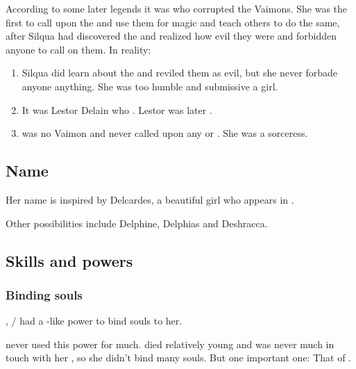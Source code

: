 According to some later legends it was \Delphine who corrupted the Vaimons.
She was the first to call upon the \qliphoth and use them for magic and teach others to do the same, after Silqua had discovered the \qliphoth and realized how evil they were and forbidden anyone to call on them.
In reality:
\begin{enumerate}
  \item 
    Silqua did learn about the \qliphoth and reviled them as evil, but she never forbade anyone anything.
    She was too humble and submissive a girl.
  \item 
    It was Lestor Delain who . 
    Lestor was later . 
  \item 
    \Delphine was no Vaimon and never called upon any \sephirah or \qliphah.
    She was a \Sarun sorceress.
\end{enumerate}










\subsection{Name}
Her name is inspired by Delcardes, a beautiful girl who appears in \cite{RobertEHoward:TheCatandtheSkull}. 

Other possibilities include Delphine, Delphias and Deshracca.









\subsection{Skills and powers}





\subsubsection{Binding souls}
\index{\carcer!\Delphine}
, \Shiaraid{}/\Delphine{} had a \sephirah-like power to bind souls to her. 

\Delphine{} never used this power for much. 
\Delphine{} died relatively young and was never much in touch with her \carcer, so she didn't bind many souls. 
But  one important one: 
That of \Eryal. 















